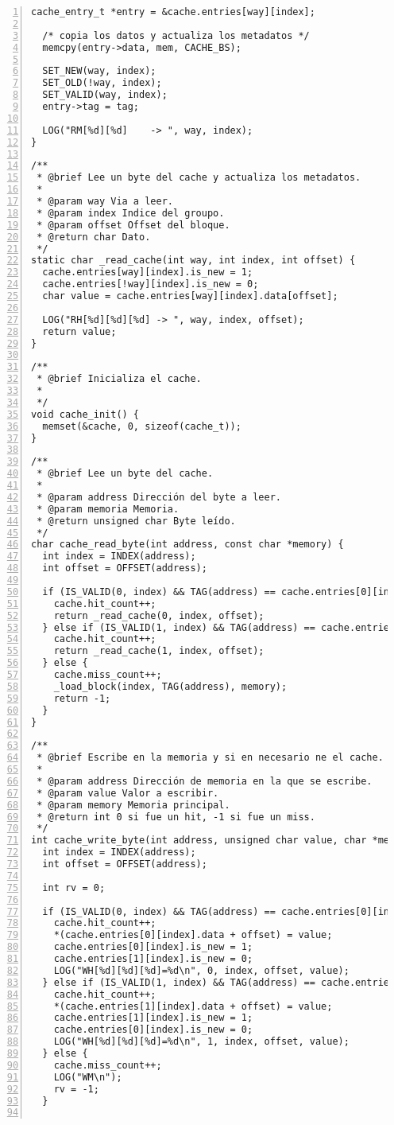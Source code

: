 \documentclass[11pt,a4paper]{article}
\begin{document}
\begin{lstlisting}[numbers=left, tabsize=2, basicstyle=\fontsize{11}{13}\ttfamily, frame=single, caption={makefile}]
  cache_entry_t *entry = &cache.entries[way][index];

  /* copia los datos y actualiza los metadatos */
  memcpy(entry->data, mem, CACHE_BS);

  SET_NEW(way, index);
  SET_OLD(!way, index);
  SET_VALID(way, index);
  entry->tag = tag;

  LOG("RM[%d][%d]    -> ", way, index);
}

/**
 * @brief Lee un byte del cache y actualiza los metadatos.
 *
 * @param way Via a leer.
 * @param index Indice del groupo.
 * @param offset Offset del bloque.
 * @return char Dato.
 */
static char _read_cache(int way, int index, int offset) {
  cache.entries[way][index].is_new = 1;
  cache.entries[!way][index].is_new = 0;
  char value = cache.entries[way][index].data[offset];

  LOG("RH[%d][%d][%d] -> ", way, index, offset);
  return value;
}

/**
 * @brief Inicializa el cache.
 *
 */
void cache_init() {
  memset(&cache, 0, sizeof(cache_t));
}

/**
 * @brief Lee un byte del cache.
 *
 * @param address Dirección del byte a leer.
 * @param memoria Memoria.
 * @return unsigned char Byte leído.
 */
char cache_read_byte(int address, const char *memory) {
  int index = INDEX(address);
  int offset = OFFSET(address);

  if (IS_VALID(0, index) && TAG(address) == cache.entries[0][index].tag) {
    cache.hit_count++;
    return _read_cache(0, index, offset);
  } else if (IS_VALID(1, index) && TAG(address) == cache.entries[1][index].tag) {
    cache.hit_count++;
    return _read_cache(1, index, offset);
  } else {
    cache.miss_count++;
    _load_block(index, TAG(address), memory);
    return -1;
  }
}

/**
 * @brief Escribe en la memoria y si en necesario ne el cache.
 *
 * @param address Dirección de memoria en la que se escribe.
 * @param value Valor a escribir.
 * @param memory Memoria principal.
 * @return int 0 si fue un hit, -1 si fue un miss.
 */
int cache_write_byte(int address, unsigned char value, char *memory) {
  int index = INDEX(address);
  int offset = OFFSET(address);

  int rv = 0;

  if (IS_VALID(0, index) && TAG(address) == cache.entries[0][index].tag) {
    cache.hit_count++;
    *(cache.entries[0][index].data + offset) = value;
    cache.entries[0][index].is_new = 1;
    cache.entries[1][index].is_new = 0;
    LOG("WH[%d][%d][%d]=%d\n", 0, index, offset, value);
  } else if (IS_VALID(1, index) && TAG(address) == cache.entries[1][index].tag) {
    cache.hit_count++;
    *(cache.entries[1][index].data + offset) = value;
    cache.entries[1][index].is_new = 1;
    cache.entries[0][index].is_new = 0;
    LOG("WH[%d][%d][%d]=%d\n", 1, index, offset, value);
  } else {
    cache.miss_count++;
    LOG("WM\n");
    rv = -1;
  }


\end{lstlisting}
\end{document}
